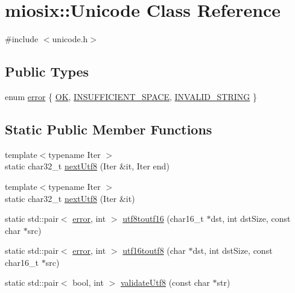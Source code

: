 \hypertarget{classmiosix_1_1_unicode}{\section{miosix\-:\-:Unicode Class Reference}
\label{classmiosix_1_1_unicode}
}


{\ttfamily \#include $<$unicode.\-h$>$}

\subsection*{Public Types}
\begin{DoxyCompactItemize}
\item 
enum \hyperlink{classmiosix_1_1_unicode_a8ceeeb1a0494155d2af8f406bff8a771}{error} \{ \hyperlink{classmiosix_1_1_unicode_a8ceeeb1a0494155d2af8f406bff8a771ad816215c1f9350a7a4e32db33d2458c0}{O\-K}, 
\hyperlink{classmiosix_1_1_unicode_a8ceeeb1a0494155d2af8f406bff8a771aff170a937bd05102ab71db0fce213a90}{I\-N\-S\-U\-F\-F\-I\-C\-I\-E\-N\-T\-\_\-\-S\-P\-A\-C\-E}, 
\hyperlink{classmiosix_1_1_unicode_a8ceeeb1a0494155d2af8f406bff8a771a4dd7d16ca830b5b6a12bc08763142536}{I\-N\-V\-A\-L\-I\-D\-\_\-\-S\-T\-R\-I\-N\-G}
 \}
\end{DoxyCompactItemize}
\subsection*{Static Public Member Functions}
\begin{DoxyCompactItemize}
\item 
{\footnotesize template$<$typename Iter $>$ }\\static char32\-\_\-t \hyperlink{classmiosix_1_1_unicode_adef16e910c66b96aeb3cb99aea8672cb}{next\-Utf8} (Iter \&it, Iter end)
\item 
{\footnotesize template$<$typename Iter $>$ }\\static char32\-\_\-t \hyperlink{classmiosix_1_1_unicode_a95e732c7f1940110a1d53fa1fae6967d}{next\-Utf8} (Iter \&it)
\item 
static std\-::pair$<$ \hyperlink{classmiosix_1_1_unicode_a8ceeeb1a0494155d2af8f406bff8a771}{error}, int $>$ \hyperlink{classmiosix_1_1_unicode_a721c5ac8ebed2615c2d0476091ba01e8}{utf8toutf16} (char16\-\_\-t $\ast$dst, int dst\-Size, const char $\ast$src)
\item 
static std\-::pair$<$ \hyperlink{classmiosix_1_1_unicode_a8ceeeb1a0494155d2af8f406bff8a771}{error}, int $>$ \hyperlink{classmiosix_1_1_unicode_a4972117d08f36e1005d71c529c2d381f}{utf16toutf8} (char $\ast$dst, int dst\-Size, const char16\-\_\-t $\ast$src)
\item 
static std\-::pair$<$ bool, int $>$ \hyperlink{classmiosix_1_1_unicode_a6a43f77dfc0660495f835fc276003bb0}{validate\-Utf8} (const char $\ast$str)
\end{DoxyCompactItemize}
